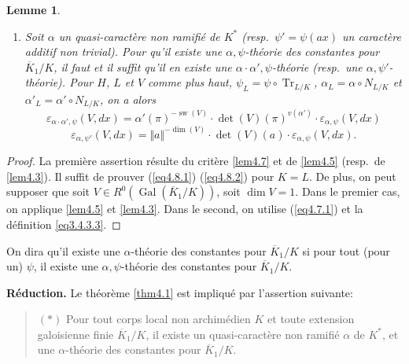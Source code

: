 \documentclass[11pt,a4paper]{amsart}
\theoremstyle{plain}
\newtheorem{lemma}[theorem]{Lemme}
\theoremstyle{definition}
\DeclareMathOperator{\Gal}{Gal}
\DeclareMathOperator{\Tr}{Tr}
\DeclareMathOperator{\sw}{sw}
\def\dim{\mathop{\mathrm{dim}}\nolimits}
\newenvironment{reduction}{\par\noindent\textbf{R\'eduction. }}{\par}
\newcommand{\ov}[1]{\overline{#1}}
\newcommand{\eps}{\varepsilon}
\newcommand{\vl}{\Vert}
\newcommand{\vr}{\Vert}
\begin{document}
\begin{lemma}\label{lem4.8}
\begin{enumerate}
\item[\rm(i)] Soit $\alpha$ un quasi-caract\`ere non ramifi\'e de $K^{*}$ (resp.~$\psi' = \psi(ax)$ un caract\`ere additif non trivial). Pour qu'il existe une $\alpha,\psi$-th\'eorie des constantes pour $\ov{K}_{1}/K$, il faut et il suffit qu'il en existe une $\alpha\cdot\alpha',\psi$-th\'eorie (resp.~une $\alpha,\psi'$-th\'eorie). Pour $H$, $L$ et $V$ comme plus haut, $\psi_{L} = \psi \circ \Tr_{L/K}$, $\alpha_{L} = \alpha \circ N_{L/K}$ et $\alpha'_{L} = \alpha' \circ N_{L/K}$, on a alors
\begin{equation}\label{eq4.8.1}
\eps_{\alpha\cdot\alpha',\psi}(V,dx) = \alpha'(\pi)^{-\sw(V)} \cdot \det(V)(\pi)^{v(\alpha')} \cdot \eps_{\alpha,\psi}(V,dx)
\end{equation}
\begin{equation}\label{eq4.8.2}
\eps_{\alpha,\psi'}(V,dx) = \vl a \vr^{-\dim(V)} \cdot \det(V)(a) \cdot \eps_{\alpha,\psi}(V,dx).
\end{equation}
\end{enumerate}
\end{lemma}

\begin{proof}
La premi\`ere assertion r\'esulte du crit\`ere \ref{lem4.7} et de \ref{lem4.5} (resp.~de \ref{lem4.3}). Il suffit de prouver (\ref{eq4.8.1}) (\ref{eq4.8.2}) pour $K = L$. De plus, on peut supposer que soit $V \in R^{0}(\Gal(\ov{K}_{1}/K))$, soit $\dim V = 1$. Dans le premier cas, on applique \ref{lem4.5} et \ref{lem4.3}. Dans le second, on utilise (\ref{eq4.7.1}) et la d\'efinition \ref{eq3.4.3.3}.
\end{proof}

On dira qu'il existe une $\alpha$-th\'eorie des constantes pour $\ov{K}_{1}/K$ si pour tout (pour un) $\psi$, il existe une $\alpha,\psi$-th\'eorie des constantes pour $\ov{K}_{1}/K$.

\begin{reduction}\label{red4.9}
Le th\'eor\`eme \ref{thm4.1} est impliqu\'e par l'assertion suivante:
\begin{quote}
$(*)$ Pour tout corps local non archim\'edien $K$ et toute extension galoisienne finie $\ov{K}_{1}/K$, il existe un quasi-caract\`ere non ramifi\'e $\alpha$ de $K^{*}$, et une $\alpha$-th\'eorie des constantes pour $\ov{K}_{1}/K$.
\end{quote}
\end{reduction}
\end{document}

